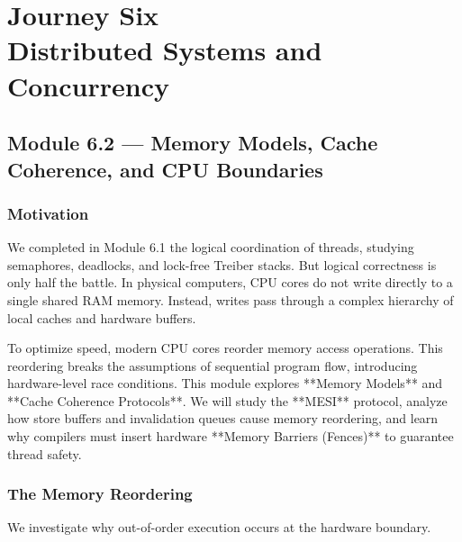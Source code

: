 \documentclass[12pt, a4paper]{book}
\begin{document}
\setcounter{chapter}{5}
\chapter[Journey 6 --- Distributed Systems and Concurrency]
        {Journey Six\\[8pt]
         \textcolor{ModuleColor}{\large Distributed Systems and Concurrency}}
\setcounter{section}{1}

\section{Module 6.2 --- Memory Models, Cache Coherence, and CPU Boundaries}
\label{sec:mod6.2}

\subsection*{Motivation}

We completed in Module 6.1 the logical coordination of threads, studying semaphores, deadlocks, and lock-free Treiber stacks.
But logical correctness is only half the battle.
In physical computers, CPU cores do not write directly to a single shared RAM memory.
Instead, writes pass through a complex hierarchy of local caches and hardware buffers.

To optimize speed, modern CPU cores reorder memory access operations.
This reordering breaks the assumptions of sequential program flow, introducing hardware-level race conditions.
This module explores **Memory Models** and **Cache Coherence Protocols**.
We will study the **MESI** protocol, analyze how store buffers and invalidation queues cause memory reordering, and learn why compilers must insert hardware **Memory Barriers (Fences)** to guarantee thread safety.

\subsection{The Memory Reordering}

We investigate why out-of-order execution occurs at the hardware boundary.
\end{document}
